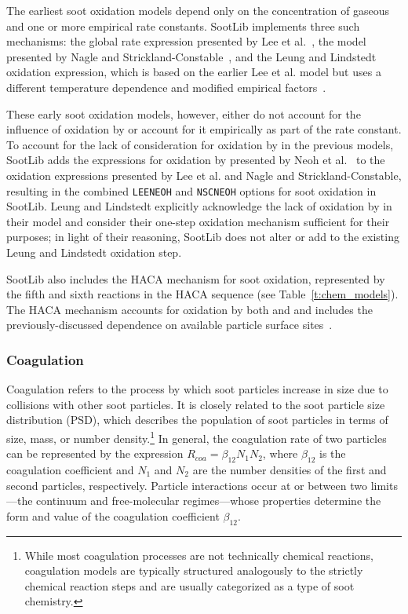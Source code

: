 \documentclass[preprint,letterpaper]{elsarticle}
\begin{document}
The earliest soot oxidation models depend only on the concentration of gaseous  and one or more empirical rate constants. SootLib implements three such mechanisms: the global rate expression presented by Lee et al.~\cite{Lee_1962}, the model presented by Nagle and Strickland-Constable~\cite{Nagle_1962}, and the Leung and Lindstedt oxidation expression, which is based on the earlier Lee et al. model but uses a different temperature dependence and modified empirical factors~\cite{Leung_1991}.

These early soot oxidation models, however, either do not account for the influence of oxidation by  or account for it empirically as part of the rate constant. To account for the lack of consideration for oxidation by  in the previous models, SootLib adds the expressions for oxidation by  presented by Neoh et al.~\cite{Neoh_1980,Neoh_1981} to the oxidation expressions presented by Lee et al. and Nagle and Strickland-Constable, resulting in the combined \texttt{LEE\textunderscore NEOH} and \texttt{NSC\textunderscore NEOH} options for soot oxidation in SootLib. Leung and Lindstedt explicitly acknowledge the lack of oxidation by  in their model and consider their one-step oxidation mechanism sufficient for their purposes; in light of their reasoning, SootLib does not alter or add to the existing Leung and Lindstedt oxidation step.

SootLib also includes the HACA mechanism for soot oxidation, represented by the fifth and sixth reactions in the HACA sequence (see Table~\ref{t:chem_models}). The HACA mechanism accounts for oxidation by both  and  and includes the previously-discussed dependence on available particle surface sites~\cite{Appel_2000}.

\subsubsection{Coagulation}
\label{s:coa}

Coagulation refers to the process by which soot particles increase in size due to collisions with other soot particles. It is closely related to the soot particle size distribution (PSD), which describes the population of soot particles in terms of size, mass, or number density.\footnote{While most coagulation processes are not technically chemical reactions, coagulation models are typically structured analogously to the strictly chemical reaction steps and are usually categorized as a type of soot chemistry.}
In general, the coagulation rate of two particles can be represented by the expression $R_{coa}=\beta_{12}N_1N_2$, where $\beta_{12}$ is the coagulation coefficient and $N_1$ and $N_2$ are the number densities of the first and second particles, respectively. Particle interactions occur at or between two limits---the continuum and free-molecular regimes---whose properties determine the form and value of the coagulation coefficient $\beta_{12}$.
\end{document}
